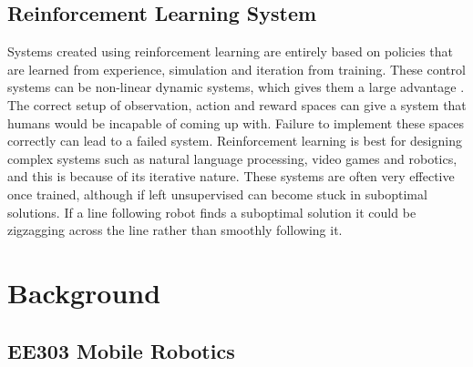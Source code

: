 \documentclass[a4paper,12pt]{article}
\begin{document}
\subsection{Reinforcement Learning System}

Systems created using reinforcement learning are entirely based on policies that are learned from experience, simulation and iteration from training. These control systems can be non-linear dynamic systems, which gives them a large advantage \cite{dev2021machine}. The correct setup of observation, action and reward spaces can give a system that humans would be incapable of coming up with. Failure to implement these spaces correctly can lead to a failed system. Reinforcement learning is best for designing complex systems such as natural language processing, video games and robotics, and this is because of its iterative nature. These systems are often very effective once trained, although if left unsupervised can become stuck in suboptimal solutions. If a line following robot finds a suboptimal solution it could be zigzagging across the line rather than smoothly following it.

\section{Background}
\subsection{EE303 Mobile Robotics}
\end{document}
